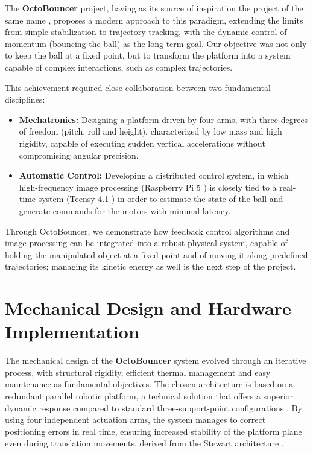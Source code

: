 \documentclass[12pt,a4paper]{report}
\begin{document}
The \textbf{OctoBouncer} project, having as its source of inspiration the project of the same name \cite{source_project}, proposes a modern approach to this paradigm, extending the limits from simple stabilization to trajectory tracking, with the dynamic control of momentum (bouncing the ball) as the long-term goal. Our objective was not only to keep the ball at a fixed point, but to transform the platform into a system capable of complex interactions, such as complex trajectories.

This achievement required close collaboration between two fundamental disciplines:

\begin{itemize}[leftmargin=2cm]
    \item \textbf{Mechatronics:} Designing a platform driven by four arms, with three degrees of freedom (pitch, roll and height), characterized by low mass and high rigidity, capable of executing sudden vertical accelerations without compromising angular precision.
    \item \textbf{Automatic Control:} Developing a distributed control system, in which high-frequency image processing (Raspberry Pi 5 \cite{rpi5}) is closely tied to a real-time system (Teensy 4.1 \cite{teensy41}) in order to estimate the state of the ball and generate commands for the motors with minimal latency.
\end{itemize}

Through OctoBouncer, we demonstrate how feedback control algorithms and image processing can be integrated into a robust physical system, capable of holding the manipulated object at a fixed point and of moving it along predefined trajectories; managing its kinetic energy as well is the next step of the project.

\chapter{Mechanical Design and Hardware \newline Implementation}
\label{chap:hardware}

The mechanical design of the \textbf{OctoBouncer} system evolved through an iterative process, with structural rigidity, efficient thermal management and easy maintenance as fundamental objectives. The chosen architecture is based on a redundant parallel robotic platform, a technical solution that offers a superior dynamic response compared to standard three-support-point configurations \cite{parallel_robot}. By using four independent actuation arms, the system manages to correct positioning errors in real time, ensuring increased stability of the platform plane even during translation movements, derived from the Stewart architecture \cite{ik_stewart}.
\end{document}
